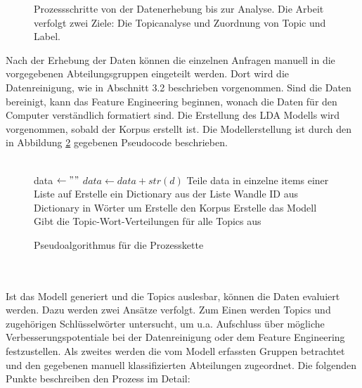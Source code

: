 \documentclass[german,version-2020-11]{uzl-thesis}
\begin{document}
\begin{itemize}
\begin{figure}[H]
\begin{center}
\caption{Prozessschritte von der Datenerhebung bis zur Analyse. Die Arbeit verfolgt zwei Ziele: Die Topicanalyse und Zuordnung von Topic und Label.}
\label{fig:flowchart}
\end{center}
\end{figure}

Nach der Erhebung der Daten können die einzelnen Anfragen manuell in die vorgegebenen Abteilungsgruppen eingeteilt werden. Dort wird die Datenreinigung, wie in Abschnitt 3.2 beschrieben vorgenommen. Sind die Daten bereinigt, kann das Feature Engineering beginnen, wonach die Daten für den Computer verständlich formatiert sind. Die Erstellung des LDA Modells wird vorgenommen, sobald der Korpus erstellt ist. Die Modellerstellung ist durch den in Abbildung \ref{fig:code1} gegebenen Pseudocode beschrieben. \\
\\

\begin{figure}[h]
\begin{algorithmic}
\STATE data $\leftarrow " "$
 $data \leftarrow data + str(d)$\ENDFOR 
\STATE Teile data in einzelne items einer Liste auf
\STATE Erstelle ein Dictionary aus der Liste
\STATE Wandle ID aus Dictionary in Wörter um
\STATE Erstelle den Korpus
\STATE Erstelle das Modell
\STATE Gibt die Topic-Wort-Verteilungen für alle Topics aus
\end{algorithmic}
\caption{Pseudoalgorithmus für die Prozesskette}
\label{fig:code1}
\end{figure}
\\

\\

Ist das Modell generiert und die Topics auslesbar, können die Daten evaluiert werden. Dazu werden zwei Ansätze verfolgt. Zum Einen werden Topics und zugehörigen Schlüsselwörter untersucht, um u.a. Aufschluss über mögliche Verbesserungspotentiale bei der Datenreinigung oder dem Feature Engineering festzustellen. Als zweites werden die vom Modell erfassten Gruppen betrachtet und den gegebenen manuell klassifizierten Abteilungen zugeordnet. Die folgenden Punkte beschreiben den Prozess im Detail: \\


\end{itemize}
\end{document}
